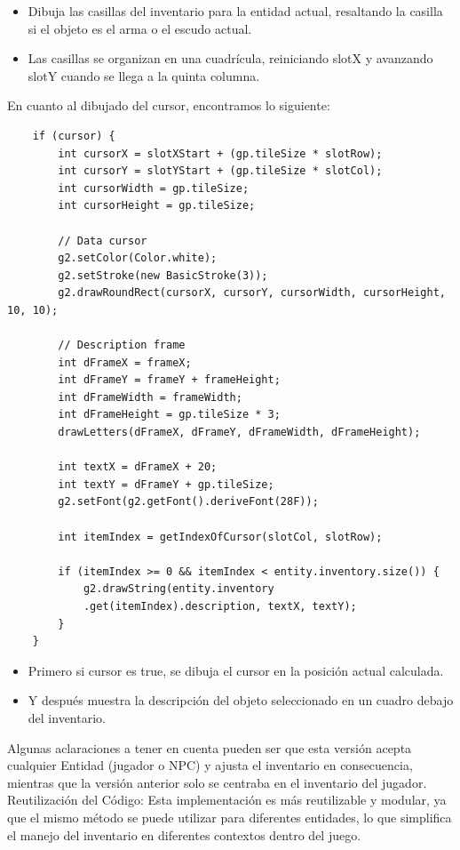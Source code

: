 \documentclass[a4paper]{article}
\begin{document}
\begin{itemize}
    \item Dibuja las casillas del inventario para la entidad actual, resaltando la casilla si el objeto es el arma o el escudo actual.
    \item Las casillas se organizan en una cuadrícula, reiniciando slotX y avanzando slotY cuando se llega a la quinta columna.
\end{itemize}
En cuanto al dibujado del cursor, encontramos lo siguiente:
\begin{lstlisting}
    if (cursor) {
        int cursorX = slotXStart + (gp.tileSize * slotRow);
        int cursorY = slotYStart + (gp.tileSize * slotCol);
        int cursorWidth = gp.tileSize;
        int cursorHeight = gp.tileSize;
    
        // Data cursor
        g2.setColor(Color.white);
        g2.setStroke(new BasicStroke(3));
        g2.drawRoundRect(cursorX, cursorY, cursorWidth, cursorHeight, 10, 10);
    
        // Description frame
        int dFrameX = frameX;
        int dFrameY = frameY + frameHeight;
        int dFrameWidth = frameWidth;
        int dFrameHeight = gp.tileSize * 3;
        drawLetters(dFrameX, dFrameY, dFrameWidth, dFrameHeight);
    
        int textX = dFrameX + 20;
        int textY = dFrameY + gp.tileSize;
        g2.setFont(g2.getFont().deriveFont(28F));
    
        int itemIndex = getIndexOfCursor(slotCol, slotRow);
    
        if (itemIndex >= 0 && itemIndex < entity.inventory.size()) {
            g2.drawString(entity.inventory
            .get(itemIndex).description, textX, textY);
        }
    }    
\end{lstlisting}
\begin{itemize}
    \item Primero si cursor es true, se dibuja el cursor en la posición actual calculada.
    \item Y después muestra la descripción del objeto seleccionado en un cuadro debajo del inventario.
\end{itemize}
Algunas aclaraciones a tener en cuenta pueden ser que esta versión acepta cualquier Entidad (jugador o NPC) y ajusta el inventario en consecuencia, mientras que la versión anterior solo se centraba en el inventario del jugador.\\
Reutilización del Código: Esta implementación es más reutilizable y modular, ya que el mismo método se puede utilizar para diferentes entidades, lo que simplifica el manejo del inventario en diferentes contextos dentro del juego.\\
\end{document}
